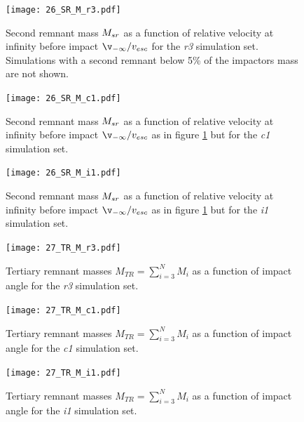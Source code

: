 \begin{landscape}
\begin{figure}[htbp]
\begin{center}
\texttt{[image: 26\_SR\_M\_r3.pdf]}
\caption{Second remnant mass $M_{sr}$ as a function of relative velocity at infinity before impact $\v_{-\infty} / \vesc$ for the \emph{r3} simulation set. Simulations with a second remnant below 5\% of the impactors mass are not shown.}
\label{ch03_fig26a}
\end{center}
\end{figure}

\begin{figure}[htbp]
\begin{center}
\texttt{[image: 26\_SR\_M\_c1.pdf]}
\caption{Second remnant mass $M_{sr}$ as a function of relative velocity at infinity before impact $\v_{-\infty} / \vesc$ as in figure \ref{ch03_fig26a} but for the \emph{c1} simulation set.}
\label{ch03_fig26b}
\end{center}
\end{figure}

\begin{figure}[htbp]
\begin{center}
\texttt{[image: 26\_SR\_M\_i1.pdf]}
\caption{Second remnant mass $M_{sr}$ as a function of relative velocity at infinity before impact $\v_{-\infty} / \vesc$ as in figure \ref{ch03_fig26a} but for the \emph{i1} simulation set.}
\label{ch03_fig26c}
\end{center}
\end{figure}
\end{landscape}


\begin{landscape}
\begin{figure}[htbp]
\begin{center}
\texttt{[image: 27\_TR\_M\_r3.pdf]}
\caption{Tertiary remnant masses $M_{TR} = \sum_{i=3}^N M_i$ as a function of impact angle for the \emph{r3} simulation set.}
\label{ch03_fig27a}
\end{center}
\end{figure}

\begin{figure}[htbp]
\begin{center}
\texttt{[image: 27\_TR\_M\_c1.pdf]}
\caption{Tertiary remnant masses $M_{TR} = \sum_{i=3}^N M_i$ as a function of impact angle for the \emph{c1} simulation set.}
\label{ch03_fig27b}
\end{center}
\end{figure}

\begin{figure}[htbp]
\begin{center}
\texttt{[image: 27\_TR\_M\_i1.pdf]}
\caption{Tertiary remnant masses $M_{TR} = \sum_{i=3}^N M_i$ as a function of impact angle for the \emph{i1} simulation set.}
\label{ch03_fig27c}
\end{center}
\end{figure}
\end{landscape}


